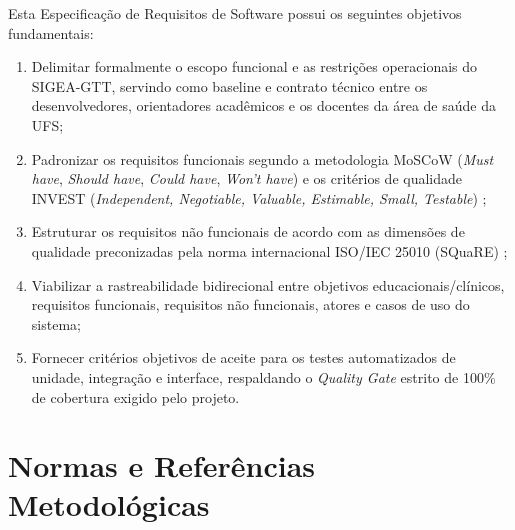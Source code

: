 Esta Especificação de Requisitos de Software possui os seguintes objetivos fundamentais:
\begin{enumerate}
    \item Delimitar formalmente o escopo funcional e as restrições operacionais do SIGEA-GTT, servindo como baseline e contrato técnico entre os desenvolvedores, orientadores acadêmicos e os docentes da área de saúde da UFS;
    \item Padronizar os requisitos funcionais segundo a metodologia MoSCoW (\textit{Must have}, \textit{Should have}, \textit{Could have}, \textit{Won't have}) e os critérios de qualidade INVEST (\textit{Independent, Negotiable, Valuable, Estimable, Small, Testable}) \cite{wiegers2013,cohn2004};
    \item Estruturar os requisitos não funcionais de acordo com as dimensões de qualidade preconizadas pela norma internacional ISO/IEC 25010 (SQuaRE) \cite{iso25010};
    \item Viabilizar a rastreabilidade bidirecional entre objetivos educacionais/clínicos, requisitos funcionais, requisitos não funcionais, atores e casos de uso do sistema;
    \item Fornecer critérios objetivos de aceite para os testes automatizados de unidade, integração e interface, respaldando o \textit{Quality Gate} estrito de 100\% de cobertura exigido pelo projeto.
\end{enumerate}

\section{Normas e Referências Metodológicas}
\label{sec_normas_referencias}

